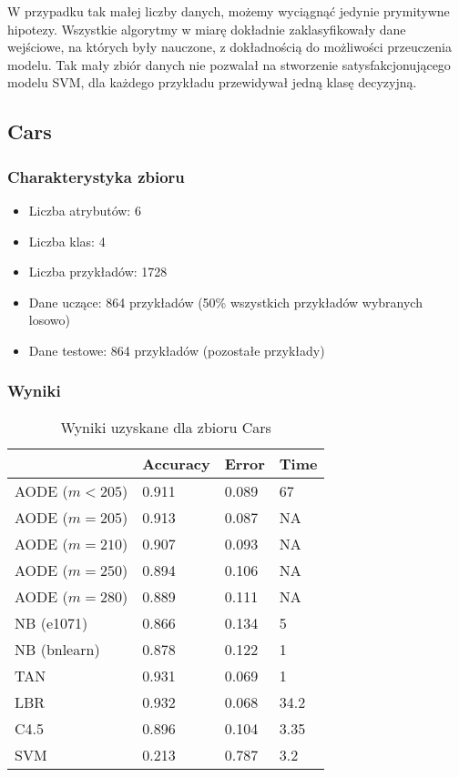 \documentclass[16]{article}
\begin{document}
W przypadku tak małej liczby danych, możemy wyciągnąć jedynie prymitywne hipotezy. Wszystkie algorytmy w miarę dokładnie zaklasyfikowały dane wejściowe, na których były nauczone, z dokładnością do możliwości przeuczenia modelu. Tak mały zbiór danych nie pozwalał na stworzenie satysfakcjonującego modelu SVM, dla każdego przykładu przewidywał jedną klasę decyzyjną.

\subsection{Cars}
\subsubsection{Charakterystyka zbioru}
\begin{itemize}
	\item Liczba atrybutów: 6
	\item Liczba klas: 4
	\item Liczba przykładów: 1728
	\item Dane uczące: 864 przykładów (50\% wszystkich przykładów wybranych losowo) 
	\item Dane testowe: 864 przykładów (pozostałe przykłady)
\end{itemize}
\subsubsection{Wyniki}
\begin{table}[ht]
\begin{center}
\begin{tabular}{ |l|l|l|l| }
\hline
	 &  Accuracy & Error & Time
 \\ \hline
 AODE ($m < 205$) & 0.911 & 0.089 & 67
 \\ \hline
 AODE ($m = 205$) &  0.913 & 0.087 & NA
 \\ \hline
 AODE ($m = 210$) & 0.907 & 0.093 & NA
 \\ \hline
 AODE ($m = 250$) & 0.894 & 0.106 & NA
 \\ \hline
 AODE ($m = 280$) & 0.889 & 0.111 & NA
 \\ \hline
 NB (e1071) & 0.866 & 0.134 & 5
  \\ \hline
 NB (bnlearn) & 0.878 & 0.122 & 1
 \\ \hline
 TAN & 0.931 & 0.069 & 1
 \\ \hline
 LBR & 0.932 & 0.068 & 34.2
 \\ \hline
 C4.5 & 0.896 & 0.104 & 3.35
 \\ \hline
 SVM & 0.213 & 0.787 & 3.2
 \\ \hline
\end{tabular}\\
\caption{Wyniki uzyskane dla zbioru Cars}
\end{center}
\end{table}
\end{document}

